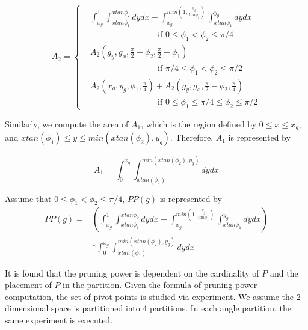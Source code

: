 \begin{equation}
\label{Equ:A2}
A_2 = 
\begin{cases}
& \int_{x_g}^{1} \int_{x tan \phi_1}^{x tan \phi_2} dydx- \int_{x_g}^{min(1, \frac{y_g}{tan \phi_1})} \int_{x tan \phi_1}^{y_g} dydx  \\
& \qquad \qquad \qquad \qquad \mbox{if } 0 \leq \phi_1 < \phi_2 \leq \pi/4 \\ 
& A_2(g_y, g_x, \frac{\pi}{2} - \phi_2, \frac{\pi}{2} - \phi_1)\\
& \qquad \qquad \qquad \qquad \mbox{if } \pi/4 \leq \phi_1 < \phi_2 \leq \pi/2 \\
& A_2(x_g, y_g, \phi_1, \frac{\pi}{4}) + A_2(g_y, g_x, \frac{\pi}{2} - \phi_2, \frac{\pi}{4}) \\
& \qquad \qquad \qquad \qquad \mbox{if } 0 \leq \phi_1 \leq \pi/4 \le \phi_2 \leq \pi/2
\end{cases}
\end{equation}

Similarly, we compute the area of $A_1$, which is the region defined by $0 \le x \le x_g$, and $x tan(\phi_1) \le y \le min(x tan(\phi_2), y_g)$. Therefore, $A_1$ is represented by 

\begin{equation}
A_1 = \int_{0}^{x_g} \int_{x tan(\phi_1)}^{ min(x tan(\phi_2), y_g) } dydx
\end{equation}


Assume that $0 \leq \phi_1 < \phi_2 \leq \pi/4$, $PP(g)$ is represented by 
\begin{equation}
\begin{aligned}
PP(g) = & (\int_{x_g}^{1} \int_{x tan \phi_1}^{x tan \phi_2} dydx- \int_{x_g}^{min(1, \frac{y_g}{tan \phi_1})} \int_{x tan \phi_1}^{y_g} dydx)  \\
  & * \int_{0}^{x_g} \int_{x tan(\phi_1)}^{ min(x tan(\phi_2), y_g) } dydx
\end{aligned}
\end{equation}

It is found that the pruning power is dependent on the cardinality of $P$ and the placement of $P$ in the partition. Given the formula of pruning power computation, the set of pivot points is studied via experiment. We assume the 2-dimensional space is partitioned into 4 partitions. In each angle partition, the same experiment is executed.


